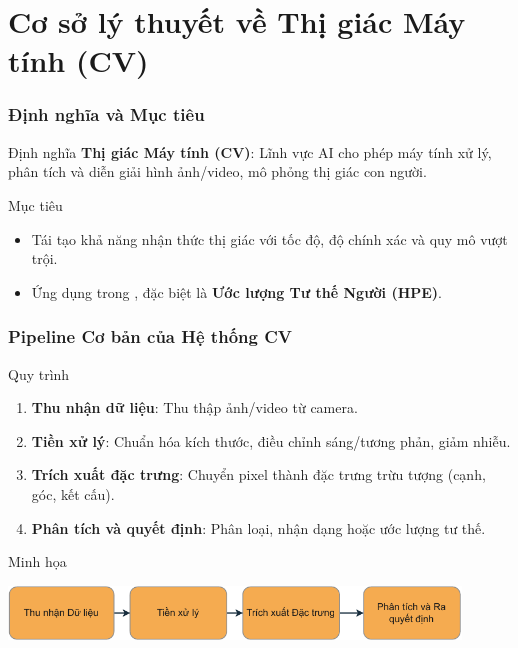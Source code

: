\section{Cơ sở lý thuyết về Thị giác Máy tính (CV)}
\begin{frame}
\frametitle{Định nghĩa và Mục tiêu}
\begin{block}{Định nghĩa}
\textbf{Thị giác Máy tính (CV)}: Lĩnh vực AI cho phép máy tính xử lý, phân tích và diễn giải hình ảnh/video, mô phỏng thị giác con người.
\end{block}

\begin{block}{Mục tiêu}
\begin{itemize}
\item Tái tạo khả năng nhận thức thị giác với tốc độ, độ chính xác và quy mô vượt trội.
\item Ứng dụng trong \TENLUANVAN, đặc biệt là \textbf{Ước lượng Tư thế Người (HPE)}.
\end{itemize}
\end{block}
\end{frame}

\begin{frame}
\frametitle{Pipeline Cơ bản của Hệ thống CV}
\begin{block}{Quy trình}
\begin{enumerate}
\item \textbf{Thu nhận dữ liệu}: Thu thập ảnh/video từ camera.
\item \textbf{Tiền xử lý}: Chuẩn hóa kích thước, điều chỉnh sáng/tương phản, giảm nhiễu.
\item \textbf{Trích xuất đặc trưng}: Chuyển pixel thành đặc trưng trừu tượng (cạnh, góc, kết cấu).
\item \textbf{Phân tích và quyết định}: Phân loại, nhận dạng hoặc ước lượng tư thế.
\end{enumerate}
\end{block}

\begin{exampleblock}{Minh họa}
\begin{center}
\includegraphics[width=0.9\textwidth]{images/vision_flow-crop.pdf}
\caption{Quy trình tổng thể của hệ thống CV.}
\label{fig:cv_pipeline}
\end{center}
\end{exampleblock}
\end{frame}

